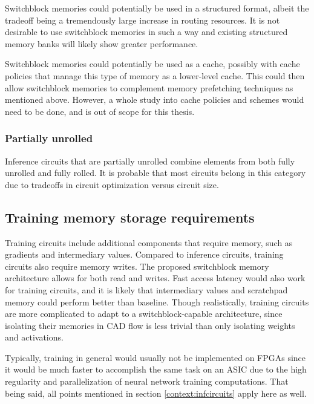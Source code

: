 Switchblock memories could potentially be used in a structured format, albeit the tradeoff being a tremendously large increase in routing resources. It is not desirable to use switchblock memories in such a way and existing structured memory banks will likely show greater performance. 

Switchblock memories could potentially be used as a cache, possibly with cache policies that manage this type of memory as a lower-level cache. This could then allow switchblock memories to complement memory prefetching techniques as mentioned above. However, a whole study into cache policies and schemes would need to be done, and is out of scope for this thesis.

\subsubsection{Partially unrolled}
Inference circuits that are partially unrolled combine elements from both fully unrolled and fully rolled. 
It is probable that most circuits belong in this category due to tradeoffs in circuit optimization versus circuit size. 

\subsection{Training memory storage requirements}
Training circuits include additional components that require memory, such as gradients and intermediary values. Compared to inference circuits, training circuits also require memory writes. The proposed switchblock memory architecture allows for both read and writes. Fast access latency would also work for training circuits, and it is likely that intermediary values and scratchpad memory could perform better than baseline. Though realistically, training circuits are more complicated to adapt to a switchblock-capable architecture, since isolating their memories in CAD flow is less trivial than only isolating weights and activations.

Typically, training in general would usually not be implemented on FPGAs since it would be much faster to accomplish the same task on an ASIC due to the high regularity and parallelization of neural network training computations. That being said, all points mentioned in section \ref{context:infcircuits} apply here as well.

